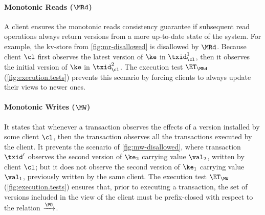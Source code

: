 \paragraph{Monotonic Reads ($\MRd$)}
A client ensures the monotonic reads consistency guarantee if subsequent read operations always 
return versions from a more up-to-date state of the system. For example, the kv-store from \cref{fig:mr-disallowed} is disallowed 
by $\MRd$.
Because client $\cl$ first observes the latest version of $\ke$ in $\txid_{\cl}^{1}$, then it
observes the initial version of $\ke$ in $\txid_{\cl}^{2}$.
The execution test $\ET_{\MRd}$ (\cref{fig:execution.tests}) prevents this scenario by 
forcing clients to always update their views to newer ones. 

\paragraph{Monotonic Writes ($\MW$)}
It states that whenever a transaction observes the effects of a version installed by some client $\cl$, then 
the transaction observes all the transactions executed by the client. It prevents 
the scenario of \cref{fig:mw-disallowed}, where transaction $\txid'$ observes the 
second version of $\ke_2$ carrying value $\val_2$, written by client $\cl$; but it does not observe the second version 
of $\ke_1$ carrying value $\val_1$, previously written by the same client.
The execution test $\ET_{\MW}$ (\cref{fig:execution.tests}) ensures 
that, prior to executing a transaction, the set of versions included in the view of the client 
must be prefix-closed with respect to the relation $\xrightarrow{\PO}$.

